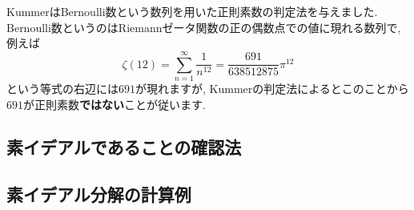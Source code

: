 \documentclass[11pt,b5paper,oneside,titlepage,lualatex]{ltjsreport}
\begin{document}
KummerはBernoulli数という数列を用いた正則素数の判定法を与えました. 
Bernoulli数というのはRiemannゼータ関数の正の偶数点での値に現れる数列で, 例えば
\[
\zeta(12) = \sum_{n=1}^{\infty} \frac{1}{n^{12}} = \frac{691}{638512875} \pi^{12}
\]
という等式の右辺には$ 691 $が現れますが, Kummerの判定法によるとこのことから$ 691 $が正則素数\textbf{ではない}ことが従います. 




\section{素イデアルであることの確認法} \label{sec:素イデアルであることの確認法}






\section{素イデアル分解の計算例} \label{sec:素イデアル分解の計算例}







\clearpage






\chapter{} \label{chap:}






\section{} \label{sec:}

\end{document}
